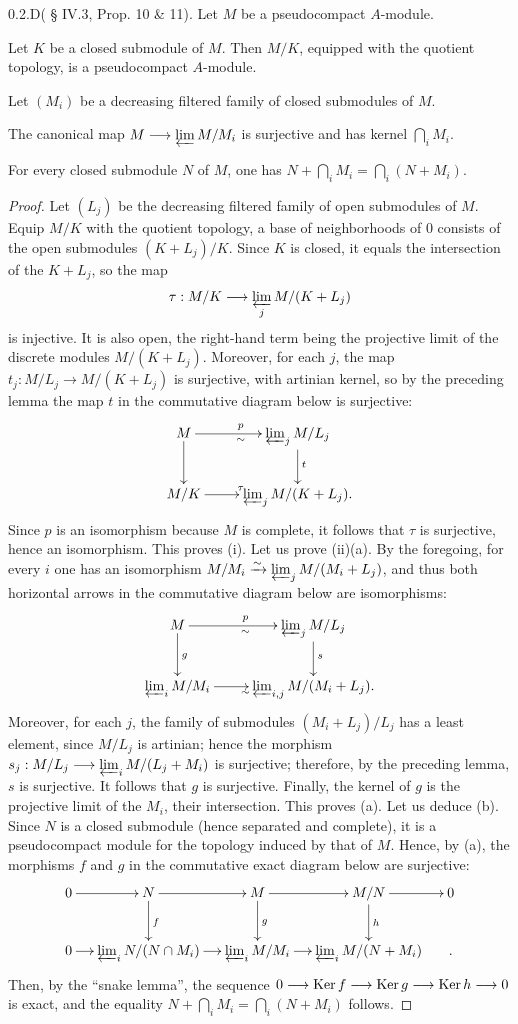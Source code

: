 \begin{corollary}{0.2.D}\label{VIIB.0.2.D}(\cite{CA} § IV.3, Prop. 10 \& 11). Let $M$ be a pseudocompact $A$-module.
\begin{enumeratei}
\item Let $K$ be a closed submodule of $M$. Then $M/K$, equipped with the quotient topology, is a pseudocompact $A$-module.
\item Let $(M_i)$ be a decreasing filtered family of closed submodules of $M$.
\begin{enumeratea}
\item The canonical map $M\to\varprojlim M/M_i$ is surjective and has kernel $\bigcap_i M_i$.
\item For every closed submodule $N$ of $M$, one has $N+\bigcap_i M_i=\bigcap_i(N+M_i)$.
\end{enumeratea}
\end{enumeratei}
\end{corollary}
\begin{proof}
Let $(L_j)$ be the decreasing filtered family of open submodules of $M$. Equip $M/K$ with the quotient topology, \ie a base of neighborhoods of $0$ consists of the open submodules $(K+L_j)/K$. Since $K$ is closed, it equals the intersection of the $K+L_j$, so the map
\[
\tau:M/K\to\varprojlim_j M/(K+L_j)
\]
is injective. It is also open, the right-hand term being the projective limit of the discrete modules $M/(K+L_j)$. Moreover, for each $j$, the map $t_j:M/L_j\to M/(K+L_j)$ is surjective, with artinian kernel, so by the preceding lemma the map $t$ in the commutative diagram below is surjective:
\[
\xymatrix{M\ar[r]^p_\sim\ar[d]&\varprojlim_j M/L_j\ar[d]^t\\
M/K\ar[r]^\tau&\varprojlim_j M/(K+L_j).}
\]
Since $p$ is an isomorphism because $M$ is complete, it follows that $\tau$ is surjective, hence an isomorphism. This proves (i).
Let us prove (ii)(a). By the foregoing, for every $i$ one has an isomorphism $M/M_i\isomto\varprojlim_j M/(M_i+L_j)$, and thus both horizontal arrows in the commutative diagram below are isomorphisms:
\[
\xymatrix{M\ar[r]^p_\sim\ar[d]^g&\varprojlim_j M/L_j\ar[d]^s\\
\varprojlim_i M/M_i\ar[r]_\sim&\varprojlim_{i,j}M/(M_i+L_j).}
\]
Moreover, for each $j$, the family of submodules $(M_i+L_j)/L_j$ has a least element, since $M/L_j$ is artinian; hence the morphism $s_j:M/L_j\to\varprojlim_i M/(L_j+M_i)$ is surjective; therefore, by the preceding lemma, $s$ is surjective. It follows that $g$ is surjective. Finally, the kernel of $g$ is the projective limit of the $M_i$, \ie their intersection. This proves (a).
Let us deduce (b). Since $N$ is a closed submodule (hence separated and complete), it is a pseudocompact module for the topology induced by that of $M$. Hence, by (a), the morphisms $f$ and $g$ in the commutative exact diagram below are surjective:
\[
\xymatrix@C=12pt{
0\ar[r]&N\ar[r]\ar[d]^f&M\ar[r]\ar[d]^g&M/N\ar[r]\ar[d]^h&0\\
0\ar[r]&\varprojlim_i N/(N\cap M_i)\ar[r]&\varprojlim_i M/M_i\ar[r]&\varprojlim_i M/(N+M_i)&.}
\]
Then, by the ``snake lemma'', the sequence $0\to\Ker f\to\Ker g\to\Ker h\to0$ is exact, and the equality $N+\bigcap_i M_i=\bigcap_i(N+M_i)$ follows.
\end{proof}
